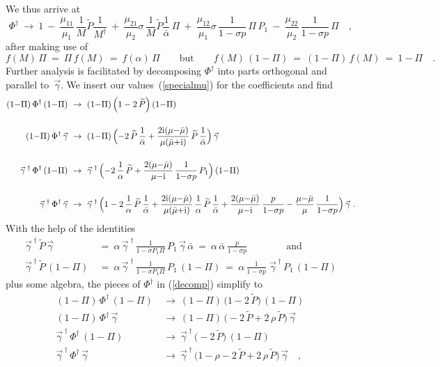 \documentclass[a4paper,11pt]{article}
\numberwithin{equation}{section}
\def\a{\alpha}
\def\g{\gamma}
\def\s{\sigma}
\def\i{\mbox{i}}
\newcommand{\Mdag}{M^{\dagger}}
\newcommand{\Pt}{\widetilde{P}}
\begin{document}
We thus arrive at
\begin{equation}
\Phi^{\dagger}\ \to\ 1\
-\ \frac{\mu_{11}}{\mu_1}\,\frac1M \Pt \frac1{\Mdag}\
+\ \frac{\mu_{21}}{\mu_2}\s\,\frac1M \Pt \frac1{\bar{\a}}\,\Pi\
+\ \frac{\mu_{12}}{\mu_1}\s\,\frac{1}{1{-}\s p}\,\Pi\,P_1\
 -\ \frac{\mu_{22}}{\mu_2}\,\frac{1}{1{-}\s p}\,\Pi \quad,
\end{equation}
after making use of
\begin{equation}
f(M)\,\Pi\ =\ \Pi\,f(M)\ =\ f(\a)\,\Pi \qquad\textrm{but}\qquad
f(M)\,(1{-}\Pi)\ =\ (1{-}\Pi)\,f(M)\ =\ 1{-}\Pi \quad.
\end{equation}
Further analysis is facilitated by decomposing $\Phi^{\dagger}$
into parts orthogonal and parallel to~$\vec{\g}$.
We insert our values~(\ref{specialmu}) for the coefficients and find
\begin{align} \label{decomp}
(1{-}\Pi)\,\Phi^\dagger\,(1{-}\Pi)\ &\to\
(1{-}\Pi)\,\Bigl(1-2\,\Pt\Bigr)\,(1{-}\Pi)\,
\\[12pt]
(1{-}\Pi)\,\Phi^\dagger\,\vec{\g}\ &\to\
(1{-}\Pi)\,\Bigl(-2\,\Pt\,\frac{1}{\bar{\a}} +
\frac{2\i(\mu{-}\bar{\mu})}{\mu(\bar{\mu}{+}\i)}\,\Pt\,
                \frac{1}{\bar{\a}}\Bigr)\,\vec{\g}
\nonumber\\[12pt]
\vec{\g}^{\;\dagger}\,\Phi^\dagger\,(1{-}\Pi)\ &\to\
\vec{\g}^{\;\dagger}\,\Bigl(-2\,\frac{1}{\a}\,\Pt +
\frac{2(\mu{-}\bar{\mu})}{\mu{-}\i}\,\frac{1}{1{-}\s p}\,P_1\Bigr)\,(1{-}\Pi)
\nonumber\\[12pt]
\vec{\g}^{\;\dagger}\,\Phi^\dagger\,\vec{\g}\ &\to\
\vec{\g}^{\;\dagger}\,\Bigl(1-2\,\frac{1}{\a}\,\Pt\,\frac{1}{\bar{\a}} +
\frac{2\i(\mu{-}\bar{\mu})}{\mu(\bar{\mu}{+}\i)}\,
                \frac{1}{\a}\,\Pt\,\frac{1}{\bar{\a}} +
\frac{2(\mu{-}\bar{\mu})}{\mu{-}\i}\,\frac{p}{1{-}\s p} -
\frac{\mu{-}\bar{\mu}}{\mu}\,\frac{1}{1{-}\s p}\Bigr)\,\vec{\g} \ .
\nonumber
\end{align}
With the help of the identities
\begin{align}
\vec{\g}^{\;\dagger}\,\Pt\,\vec{\g}\ &=\
\a\,\vec{\g}^{\;\dagger}\,\frac{1}{1-\s P_1\Pi}\,P_1\,\vec{\g}\,\bar{\a}\ =\
\a\,\bar{\a}\,\frac{p}{1-\s p} \qquad\qquad\textrm{and}
\nonumber\\[12pt]
\vec{\g}^{\;\dagger}\,\Pt\,(1{-}\Pi)\ &=\
\a\,\vec{\g}^{\;\dagger}\,\frac{1}{1-\s P_1\Pi}\,P_1\,(1{-}\Pi)\ =\
\a\,\frac{1}{1-\s p}\;\vec{\g}^{\;\dagger}\,P_1\,(1{-}\Pi)
\end{align}
plus some algebra,
the pieces of $\Phi^{\dagger}$ in (\ref{decomp}) simplify to
\begin{align}
(1{-}\Pi)\,\Phi^\dagger\,(1{-}\Pi)\ &\to\
(1{-}\Pi)\,\bigl(1-2\,\Pt\bigr)\,(1{-}\Pi)\,
\nonumber\\[8pt]
(1{-}\Pi)\,\Phi^\dagger\,\vec{\g}\ &\to\
(1{-}\Pi)\,\bigl(-2\,\Pt + 2\,\rho\,\Pt \bigr)\,\vec{\g}
\nonumber\\[8pt]
\vec{\g}^{\;\dagger}\,\Phi^\dagger\,(1{-}\Pi)\ &\to\
\vec{\g}^{\;\dagger}\,\bigl(-2\,\Pt \bigr)\,(1{-}\Pi)
\nonumber\\[8pt]
\vec{\g}^{\;\dagger}\,\Phi^\dagger\,\vec{\g}\ &\to\
\vec{\g}^{\;\dagger}\,\bigl(1-\rho-2\,\Pt+2\,\rho\,\Pt \bigr)\,\vec{\g} \quad,
\end{align}
\end{document}
